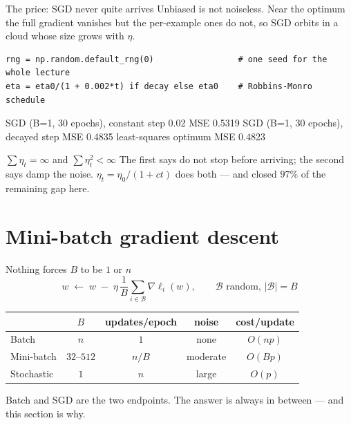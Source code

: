 \documentclass[aspectratio=169]{beamer}
\begin{document}
\begin{frame}[fragile]{The price: SGD never quite arrives}
Unbiased is not noiseless. Near the optimum the full gradient vanishes but the
per-example ones do not, so SGD orbits in a cloud whose size grows with $\eta$.
\begin{lstlisting}
rng = np.random.default_rng(0)                 # one seed for the whole lecture
eta = eta0/(1 + 0.002*t) if decay else eta0    # Robbins-Monro schedule
\end{lstlisting}
\begin{outblk}
SGD (B=1, 30 epochs), constant step 0.02   MSE 0.5319
SGD (B=1, 30 epochs), decayed step         MSE 0.4835
least-squares optimum                      MSE 0.4823
\end{outblk}
\begin{alertblock}{$\sum \eta_t = \infty$ and $\sum \eta_t^2 < \infty$}
  \footnotesize The first says do not stop before arriving; the second says
  damp the noise. $\eta_t = \eta_0/(1+ct)$ does both --- and closed $97\%$ of
  the remaining gap here.
\end{alertblock}
\end{frame}

\section[Mini-batch]{Mini-batch gradient descent}
\label{sec:mini}

\begin{frame}{Nothing forces $B$ to be $1$ or $n$}
  \[
    w \;\leftarrow\; w \;-\; \eta \,\frac{1}{B}\sum_{i \in \mathcal{B}}
      \nabla \ell_i(w),
    \qquad \mathcal{B} \text{ random, } \lvert \mathcal{B}\rvert = B
  \]
  \vspace{0.3em}
  \begin{center}
  \begin{tabular}{@{}lcccc@{}}
    \toprule
    & $B$ & updates/epoch & noise & cost/update\\
    \midrule
    Batch      & $n$          & $1$   & none     & $O(np)$\\
    Mini-batch & $32$--$512$  & $n/B$ & moderate & $O(Bp)$\\
    Stochastic & $1$          & $n$   & large    & $O(p)$\\
    \bottomrule
  \end{tabular}
  \end{center}
  \vspace{0.6em}
  \begin{center}\small
    Batch and SGD are the two endpoints. The answer is always in between ---
    and this section is why.
  \end{center}
\end{frame}
\end{document}
